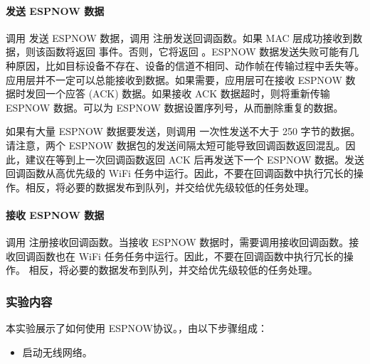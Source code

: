 \documentclass[a4paper,12pt,english]{sphinxmanual}
\begin{document}
{{\paragraph{发送 ESP\sphinxhyphen{}NOW 数据}
\label{\detokenize{exp-esp32/wifi/esp-now:id6}}
\sphinxAtStartPar
调用  发送 ESP\sphinxhyphen{}NOW 数据，调用  注册发送回调函数。如果 MAC 层成功接收到数据，则该函数将返回  事件。否则，它将返回 。ESP\sphinxhyphen{}NOW 数据发送失败可能有几种原因，比如目标设备不存在、设备的信道不相同、动作帧在传输过程中丢失等。应用层并不一定可以总能接收到数据。如果需要，应用层可在接收 ESP\sphinxhyphen{}NOW 数据时发回一个应答 (ACK) 数据。如果接收 ACK 数据超时，则将重新传输 ESP\sphinxhyphen{}NOW 数据。可以为 ESP\sphinxhyphen{}NOW 数据设置序列号，从而删除重复的数据。

\sphinxAtStartPar
如果有大量 ESP\sphinxhyphen{}NOW 数据要发送，则调用  一次性发送不大于 250 字节的数据。 请注意，两个 ESP\sphinxhyphen{}NOW 数据包的发送间隔太短可能导致回调函数返回混乱。因此，建议在等到上一次回调函数返回 ACK 后再发送下一个 ESP\sphinxhyphen{}NOW 数据。发送回调函数从高优先级的 Wi\sphinxhyphen{}Fi 任务中运行。因此，不要在回调函数中执行冗长的操作。相反，将必要的数据发布到队列，并交给优先级较低的任务处理。


\paragraph{接收 ESP\sphinxhyphen{}NOW 数据}
\label{\detokenize{exp-esp32/wifi/esp-now:id7}}
\sphinxAtStartPar
调用  注册接收回调函数。当接收 ESP\sphinxhyphen{}NOW 数据时，需要调用接收回调函数。接收回调函数也在 Wi\sphinxhyphen{}Fi 任务任务中运行。因此，不要在回调函数中执行冗长的操作。 相反，将必要的数据发布到队列，并交给优先级较低的任务处理。


\subsubsection{实验内容}
\label{\detokenize{exp-esp32/wifi/esp-now:id8}}
\sphinxAtStartPar
本实验展示了如何使用 ESP\sphinxhyphen{}NOW协议。，由以下步骤组成：
\begin{itemize}
\item {} 
\sphinxAtStartPar
启动无线网络。


\end{itemize}}}
\end{document}
